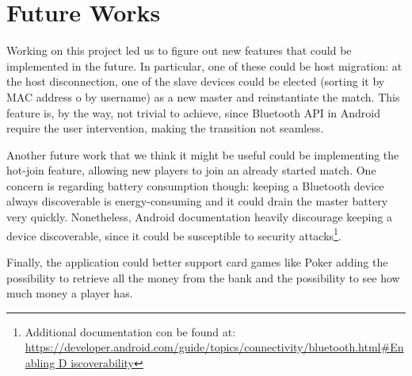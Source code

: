 \section{Future Works}

Working on this project led us to figure out new features that could be 
implemented in the future. In particular, one of these could be host migration: 
at the host disconnection, one of the slave devices could be elected (sorting it 
by MAC address o by username) as a new master and reinstantiate the match. This 
feature is, by the way, not trivial to achieve, since Bluetooth API in Android 
require the user intervention, making the transition not seamless.

Another future work that we think it might be useful could be implementing 
the hot-join feature, allowing new players to join an already started match. 
One concern is regarding battery consumption though: keeping a Bluetooth device 
always discoverable is energy-consuming and it could drain the master battery 
very quickly. Nonetheless, Android documentation heavily discourage keeping a 
device discoverable, since it could be susceptible to security 
attacks\footnote{Additional documentation con be found at: \url{ 
https://developer.android.com/guide/topics/connectivity/bluetooth.html\#Enabling
D 
iscoverability}}.

Finally, the application could better support card games like Poker adding the 
possibility to retrieve all the money from the bank and the possibility to see 
how much money a player has.